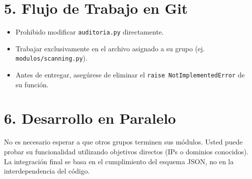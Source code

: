\documentclass{article}
\begin{document}
\section*{5. Flujo de Trabajo en Git}
\begin{itemize}
    \item Prohibido modificar \texttt{auditoria.py} directamente.
    \item Trabajar exclusivamente en el archivo asignado a su grupo (ej. \texttt{modulos/scanning.py}).
    \item Antes de entregar, asegúrese de eliminar el \texttt{raise NotImplementedError} de su función.
\end{itemize}

\section*{6. Desarrollo en Paralelo}
No es necesario esperar a que otros grupos terminen sus módulos. Usted puede probar su funcionalidad utilizando objetivos directos (IPs o dominios conocidos). La integración final se basa en el cumplimiento del esquema JSON, no en la interdependencia del código.
\end{document}
